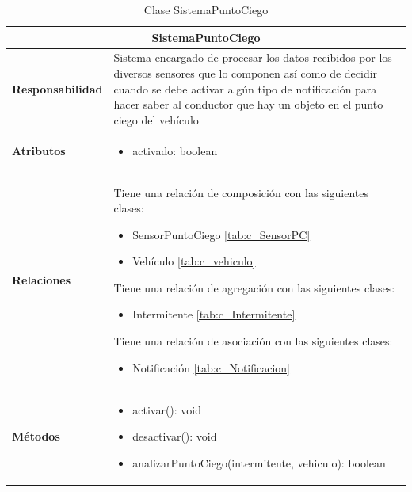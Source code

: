 \begin{table}[H]
\begin{center}
\begin{tabular}{p{} p{11cm}}
\multicolumn{2}{c}{\textbf{SistemaPuntoCiego} } \\ \hline \hline
\textbf{Responsabilidad} &  Sistema encargado de procesar los datos recibidos por los diversos sensores que lo componen así como de decidir cuando se debe activar algún tipo de notificación para hacer saber al conductor que hay un objeto en el punto ciego del vehículo\\ \hline
\textbf{Atributos} &  \begin{itemize} \item activado: boolean \end{itemize}\\ \hline
\textbf{Relaciones} & \par Tiene una relación de composición con las siguientes clases:
                      \begin{itemize}
                        \item SensorPuntoCiego \ref{tab:c_SensorPC}
                        \item Vehículo \ref{tab:c_vehiculo}
                      \end{itemize}

                      \par Tiene una relación de agregación con las siguientes clases:
                        \begin{itemize}
                          \item Intermitente \ref{tab:c_Intermitente}
                        \end{itemize}

                      \par Tiene una relación de asociación con las siguientes clases:
                      \begin{itemize}
                        \item Notificación \ref{tab:c_Notificacion}
                      \end{itemize}\\ \hline

\textbf{Métodos} &  \begin{itemize}
                      \item activar(): void
                      \item desactivar(): void
                      \item analizarPuntoCiego(intermitente, vehiculo): boolean
                    \end{itemize}\\ \hline
\end{tabular}
\caption{Clase SistemaPuntoCiego}
\label{tab:c_SPCiego}
\end{center}
\end{table}









